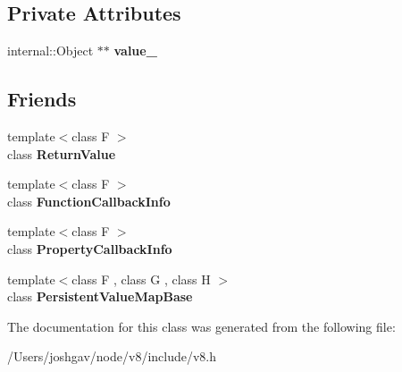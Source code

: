 \subsection*{Private Attributes}
\begin{DoxyCompactItemize}
\item 
internal\+::\+Object $\ast$$\ast$ {\bfseries value\+\_\+}\hypertarget{classv8_1_1_return_value_abb24c21d81cd11d48a5f3872529702a7}{}\label{classv8_1_1_return_value_abb24c21d81cd11d48a5f3872529702a7}

\end{DoxyCompactItemize}
\subsection*{Friends}
\begin{DoxyCompactItemize}
\item 
{\footnotesize template$<$class F $>$ }\\class {\bfseries Return\+Value}\hypertarget{classv8_1_1_return_value_a53f604d3d6f2dc0647df33c9979f116a}{}\label{classv8_1_1_return_value_a53f604d3d6f2dc0647df33c9979f116a}

\item 
{\footnotesize template$<$class F $>$ }\\class {\bfseries Function\+Callback\+Info}\hypertarget{classv8_1_1_return_value_a76786e6fa2d0eac5e2d4f647659d0d23}{}\label{classv8_1_1_return_value_a76786e6fa2d0eac5e2d4f647659d0d23}

\item 
{\footnotesize template$<$class F $>$ }\\class {\bfseries Property\+Callback\+Info}\hypertarget{classv8_1_1_return_value_a5018adab21fade2b42f4f60e45fa1083}{}\label{classv8_1_1_return_value_a5018adab21fade2b42f4f60e45fa1083}

\item 
{\footnotesize template$<$class F , class G , class H $>$ }\\class {\bfseries Persistent\+Value\+Map\+Base}\hypertarget{classv8_1_1_return_value_a08e2b8f164392d71811ce6cc134f33e3}{}\label{classv8_1_1_return_value_a08e2b8f164392d71811ce6cc134f33e3}

\end{DoxyCompactItemize}


The documentation for this class was generated from the following file\+:\begin{DoxyCompactItemize}
\item 
/\+Users/joshgav/node/v8/include/v8.\+h\end{DoxyCompactItemize}
